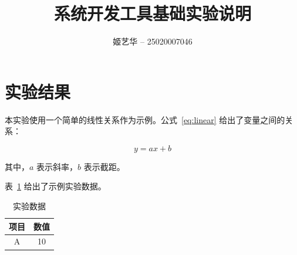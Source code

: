 \documentclass{ctexart}
\begin{document}
\title{系统开发工具基础实验说明}
\author{姬艺华 -- 25020007046}
\date{}
\maketitle

\section{实验结果}

本实验使用一个简单的线性关系作为示例。公式~\eqref{eq:linear} 给出了变量之间的关系：

\begin{equation}
y = ax + b
\label{eq:linear}
\end{equation}

其中，$a$ 表示斜率，$b$ 表示截距。

表~\ref{tab:data} 给出了示例实验数据。

\begin{table}[htbp]
\centering
\caption{实验数据}
\label{tab:data}

\begin{tabular}{|c|c|}
\hline
项目 & 数值 \\
\hline
A & 10 \\
\hline
\end{tabular}

\end{table}
\end{document}
